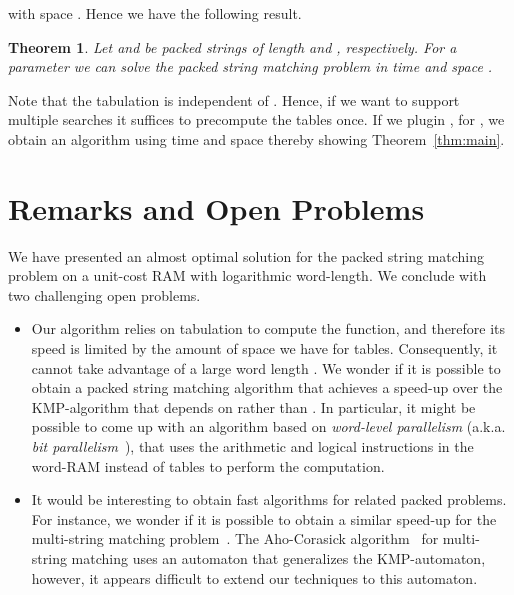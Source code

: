 \documentclass{article}
\newtheorem{theorem}{Theorem}
\begin{document}
with space . Hence we have the following result.
\begin{theorem}
  Let  and  be packed strings of length  and ,
  respectively. For a parameter  we can solve the packed
  string matching problem in time  and space .
\end{theorem}
Note that the tabulation is independent of . Hence, if we want to
support multiple searches it suffices to precompute the tables
once. If we plugin , for ,
we obtain an algorithm using time  and space
 thereby showing Theorem~\ref{thm:main}.

\section{Remarks and Open Problems}\label{sec:remarks}
We have presented an almost optimal solution for the packed string
matching problem on a unit-cost RAM with logarithmic word-length. We
conclude with two challenging open problems.

\begin{itemize}
\item Our algorithm relies on tabulation to compute the 
  function, and therefore its speed is limited by the amount of space
  we have for tables. Consequently, it cannot take advantage of a
  large word length . We wonder if it is possible to
  obtain a packed string matching algorithm that achieves a speed-up
  over the KMP-algorithm that depends on  rather than . In
  particular, it might be possible to come up with an algorithm based
  on \emph{word-level parallelism} (a.k.a. \emph{bit
    parallelism}~\cite{BaezaYates1989}), that uses the arithmetic and
  logical instructions in the word-RAM instead of tables to perform
  the computation.
\item It would be interesting to obtain fast algorithms for related
  packed problems. For instance, we wonder if it is possible to obtain
  a similar speed-up for the multi-string matching
  problem~\cite{AC1975}. The Aho-Corasick algorithm~\cite{AC1975} for
  multi-string matching uses an automaton that generalizes the
  KMP-automaton, however, it appears difficult to extend our
  techniques to this automaton.
\end{itemize}




\end{document}
